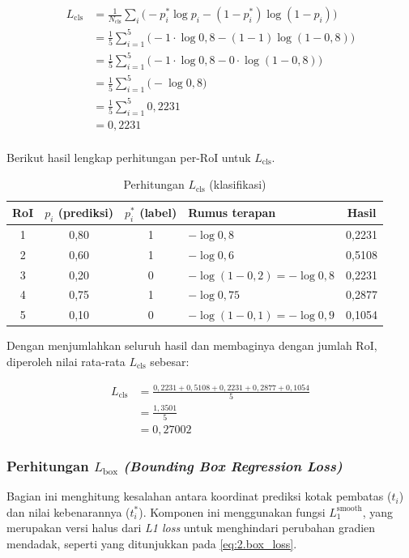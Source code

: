 \begin{align*}
    L_{\text{cls}} &= \frac{1}{N_{\text{cls}}} \sum_i \big(-p_i^* \log p_i - (1 - p_i^*) \log (1 - p_i)\big) \\[0.5em]
     &= \frac{1}{5} \sum_{i=1}^{5} \big(-1 \cdot \log 0{,}8 - (1 - 1) \log (1 - 0{,}8)\big) \\[0.5em]
     &= \frac{1}{5} \sum_{i=1}^{5} \big(-1 \cdot \log 0{,}8 - 0 \cdot \log (1 - 0{,}8)\big) \\[0.5em]
     &= \frac{1}{5} \sum_{i=1}^{5} \big(-\log 0{,}8 \big) \\[0.5em]
     &= \frac{1}{5} \sum_{i=1}^{5} 0{,}2231 \\[0.5em]
     &= 0{,}2231 \\[0.5em]
\end{align*}

Berikut hasil lengkap perhitungan per-RoI untuk $L_{\text{cls}}$.

\begin{table}[H]
\centering
\caption{Perhitungan $L_{\text{cls}}$ (klasifikasi)}
\renewcommand{\arraystretch}{1.3}
\label{table:3.loss-cls}
\begin{tabular}{|c|c|c|>{\centering\arraybackslash}m{3.7cm}|c|}
\hline
\textbf{RoI} & \textbf{$p_i$ (prediksi)} & \textbf{$p_i^*$ (label)} & \textbf{Rumus terapan} & \textbf{Hasil} \\ 
\hline
1 & 0,80 & 1 & $-\log 0{,}8$ & 0{,}2231 \\ 
\hline
2 & 0,60 & 1 & $-\log 0{,}6$ & 0{,}5108 \\ 
\hline
3 & 0,20 & 0 & $-\log (1-0{,}2) = -\log 0{,}8$ & 0{,}2231 \\ 
\hline
4 & 0,75 & 1 & $-\log 0{,}75$ & 0{,}2877 \\ 
\hline
5 & 0,10 & 0 & $-\log (1-0{,}1) = -\log 0{,}9$ & 0{,}1054 \\ 
\hline
\end{tabular}
\end{table}

Dengan menjumlahkan seluruh hasil dan membaginya dengan jumlah RoI, diperoleh nilai rata-rata $L_{\text{cls}}$ sebesar:

\begin{align*}
    L_{\text{cls}} &= \frac{0{,}2231 + 0{,}5108 + 0{,}2231 + 0{,}2877 + 0{,}1054}{5} \\[0.5em]
     &= \frac{1{,}3501}{5} \\[0.5em]
     &= 0{,}27002
\end{align*}

\subsubsection{Perhitungan $L_{\text{box}}$ \textit{(Bounding Box Regression Loss)}}
Bagian ini menghitung kesalahan antara koordinat prediksi kotak pembatas ($t_i$) dan nilai kebenarannya ($t_i^*$). Komponen ini menggunakan fungsi $L_1^{\text{smooth}}$, yang merupakan versi halus dari \textit{L1 loss} untuk menghindari perubahan gradien mendadak, seperti yang ditunjukkan pada \ref{eq:2.box_loss}.

